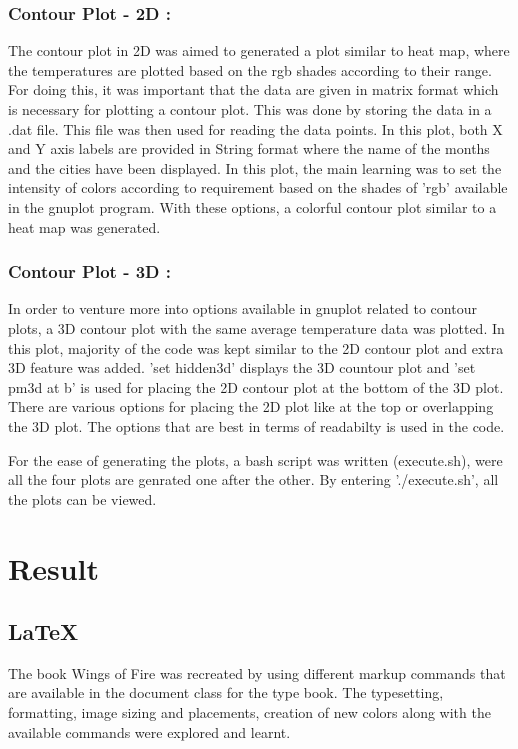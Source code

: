 \documentclass[runningheads]{llncs}
\begin{document}
\subsubsection{Contour Plot - 2D : }
The contour plot in 2D was aimed to generated a plot similar to heat map, where the temperatures are plotted based on the rgb shades according to their range. For doing this, it was important that the data are given in matrix format which is necessary for plotting a contour plot. This was done by storing the data in a .dat file. This file was then used for reading the data points. In this plot, both X and Y axis labels are provided in String format where the name of the months and the cities have been displayed. In this plot, the main learning was to set the intensity of colors according to requirement based on the shades of 'rgb' available in the gnuplot program. With these options, a colorful contour plot similar to a heat map was generated.

\subsubsection{Contour Plot - 3D : }
In order to venture more into options available in gnuplot related to contour plots, a 3D contour plot with the same average temperature data was plotted. In this plot, majority of the code was kept similar to the 2D contour plot and extra 3D feature was added. 'set hidden3d' displays the 3D countour plot and 'set pm3d at b' is used for placing the 2D contour plot at the bottom of the 3D plot. There are various options for placing the 2D plot like at the top or overlapping the 3D plot. The options that are best in terms of readabilty is used in the code.  

For the ease of generating the plots, a bash script was written (execute.sh), were all the four plots are genrated one after the other. By entering './execute.sh', all the plots can be viewed.


\section{Result}
\subsection{\LaTeX}
The book Wings of Fire was recreated by using different markup commands that are available in the document class for the type book. The typesetting, formatting, image sizing and placements, creation of new colors along with the available commands were explored and learnt.
\end{document}
